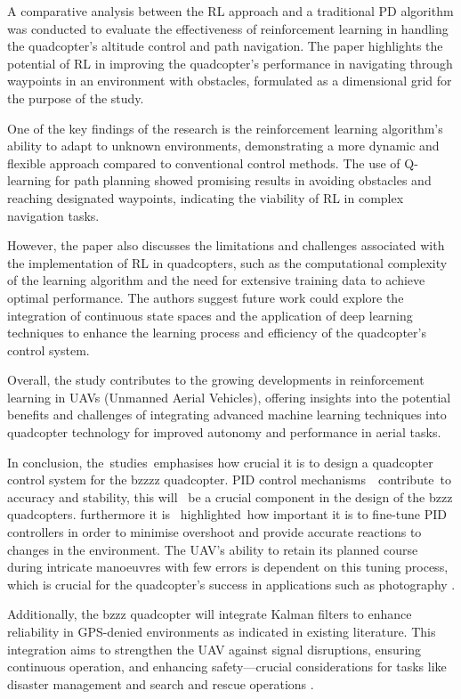 \documentclass{report}
\begin{document}
A comparative analysis between the RL approach and a traditional PD algorithm
was conducted to evaluate the effectiveness of reinforcement learning in
handling the quadcopter's altitude control and path navigation. The paper
highlights the potential of RL in improving the quadcopter's performance in
navigating through waypoints in an environment with obstacles, formulated as a
dimensional grid for the purpose of the study.

One of the key findings of the research is the reinforcement learning
algorithm's ability to adapt to unknown environments, demonstrating a more
dynamic and flexible approach compared to conventional control methods. The use
of Q-learning for path planning showed promising results in avoiding obstacles
and reaching designated waypoints, indicating the viability of RL in complex
navigation tasks.

However, the paper also discusses the limitations and challenges associated with
the implementation of RL in quadcopters, such as the computational complexity of
the learning algorithm and the need for extensive training data to achieve
optimal performance. The authors suggest future work could explore the
integration of continuous state spaces and the application of deep learning
techniques to enhance the learning process and efficiency of the quadcopter's
control system.

Overall, the study contributes to the growing developments in reinforcement
learning in UAVs (Unmanned Aerial Vehicles), offering insights into the
potential benefits and challenges of integrating advanced machine learning
techniques into quadcopter technology for improved autonomy and performance in
aerial tasks.

In conclusion, the studies emphasises how crucial it is to design a quadcopter
control system for the bzzzz quadcopter. PID control mechanisms  contribute to
accuracy and stability, this will  be a crucial component in the design of the
bzzz quadcopters. furthermore it is  highlighted how important it is to
fine-tune PID controllers in order to minimise overshoot and provide accurate
reactions to changes in the environment. The UAV's ability to retain its planned
course during intricate manoeuvres with few errors is dependent on this tuning
process, which is crucial for the quadcopter's success in applications such as
photography \cite{photographyAndVideo}.

Additionally, the bzzz quadcopter will integrate Kalman filters to enhance
reliability in GPS-denied environments as indicated in existing literature. This
integration aims to strengthen the UAV against signal disruptions, ensuring
continuous operation, and enhancing safety—crucial considerations for tasks like
disaster management \cite{disasterManagement} and search and rescue operations
\cite{searchAndRescue}.
\end{document}
